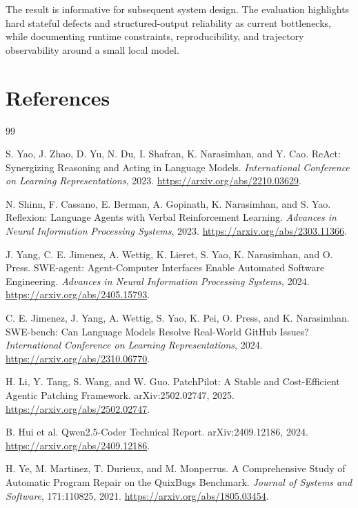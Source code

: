 \documentclass[11pt,a4paper]{article}
\begin{document}
The result is informative for subsequent system design. The evaluation
highlights hard stateful defects and structured-output reliability as current
bottlenecks, while documenting runtime constraints, reproducibility, and
trajectory observability around a small local model.

\clearpage
\clearpage
\section*{References}
\begin{thebibliography}{99}

S. Yao, J. Zhao, D. Yu, N. Du, I. Shafran, K. Narasimhan, and Y. Cao.
\newblock ReAct: Synergizing Reasoning and Acting in Language Models.
\newblock \emph{International Conference on Learning Representations}, 2023.
\newblock \url{https://arxiv.org/abs/2210.03629}.

N. Shinn, F. Cassano, E. Berman, A. Gopinath, K. Narasimhan, and S. Yao.
\newblock Reflexion: Language Agents with Verbal Reinforcement Learning.
\newblock \emph{Advances in Neural Information Processing Systems}, 2023.
\newblock \url{https://arxiv.org/abs/2303.11366}.

J. Yang, C. E. Jimenez, A. Wettig, K. Lieret, S. Yao, K. Narasimhan,
and O. Press.
\newblock SWE-agent: Agent-Computer Interfaces Enable Automated Software
Engineering.
\newblock \emph{Advances in Neural Information Processing Systems}, 2024.
\newblock \url{https://arxiv.org/abs/2405.15793}.

C. E. Jimenez, J. Yang, A. Wettig, S. Yao, K. Pei, O. Press,
and K. Narasimhan.
\newblock SWE-bench: Can Language Models Resolve Real-World GitHub Issues?
\newblock \emph{International Conference on Learning Representations}, 2024.
\newblock \url{https://arxiv.org/abs/2310.06770}.

H. Li, Y. Tang, S. Wang, and W. Guo.
\newblock PatchPilot: A Stable and Cost-Efficient Agentic Patching Framework.
\newblock arXiv:2502.02747, 2025.
\newblock \url{https://arxiv.org/abs/2502.02747}.

B. Hui et al.
\newblock Qwen2.5-Coder Technical Report.
\newblock arXiv:2409.12186, 2024.
\newblock \url{https://arxiv.org/abs/2409.12186}.

H. Ye, M. Martinez, T. Durieux, and M. Monperrus.
\newblock A Comprehensive Study of Automatic Program Repair on the QuixBugs
Benchmark.
\newblock \emph{Journal of Systems and Software}, 171:110825, 2021.
\newblock \url{https://arxiv.org/abs/1805.03454}.


\end{thebibliography}
\end{document}
